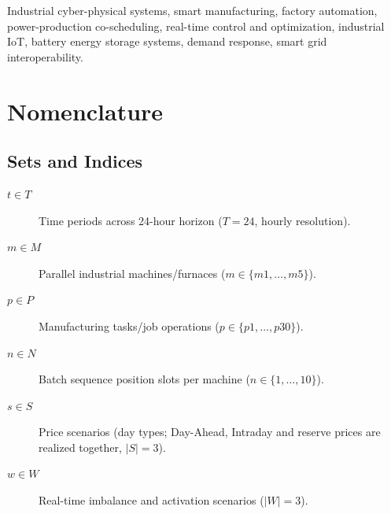 \documentclass[journal]{IEEEtran}
\begin{document}
\begin{IEEEkeywords}
Industrial cyber-physical systems, smart manufacturing, factory automation, power-production co-scheduling, real-time control and optimization, industrial IoT, battery energy storage systems, demand response, smart grid interoperability.
\end{IEEEkeywords}

\section*{Nomenclature}

\subsection{Sets and Indices}
\begin{description}
\item[$t \in T$] Time periods across 24-hour horizon
($T=24$, hourly resolution).
\item[$m \in M$] Parallel industrial machines/furnaces
($m \in \{m1, \dots, m5\}$).
\item[$p \in P$] Manufacturing tasks/job operations
($p \in \{p1, \dots, p30\}$).
\item[$n \in N$] Batch sequence position slots per machine
($n \in \{1, \dots, 10\}$).
\item[$s \in S$] Price scenarios (day types; Day-Ahead, Intraday and reserve prices are realized together, $|S|=3$).
\item[$w \in W$] Real-time imbalance and activation scenarios
($|W|=3$).
\end{description}
\end{document}
